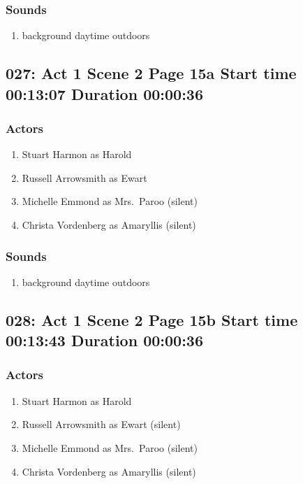 \subsubsection{Sounds}
\begin{enumerate}
\item background daytime outdoors
\end{enumerate}
\subsection{027: Act 1 Scene 2 Page 15a Start time 00:13:07 Duration 00:00:36}

\subsubsection{Actors}
\begin{enumerate}
\item Stuart Harmon as Harold
\item Russell Arrowsmith as Ewart
\item Michelle Emmond as Mrs.~Paroo (silent)
\item Christa Vordenberg as Amaryllis (silent)
\end{enumerate}

\subsubsection{Sounds}
\begin{enumerate}
\item background daytime outdoors
\end{enumerate}
\subsection{028: Act 1 Scene 2 Page 15b Start time 00:13:43 Duration 00:00:36}

\subsubsection{Actors}
\begin{enumerate}
\item Stuart Harmon as Harold
\item Russell Arrowsmith as Ewart (silent)
\item Michelle Emmond as Mrs.~Paroo (silent)
\item Christa Vordenberg as Amaryllis (silent)
\end{enumerate}


